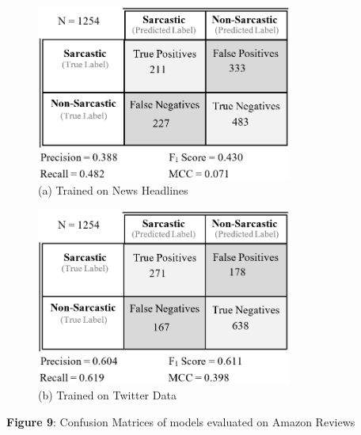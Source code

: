 \documentclass[12pt,a4paper]{article}
\begin{document}
\begin{minipage}{0.4\textwidth}
	\vspace{-5pt}\begin{figure}[H]
		\begin{center}
			\includegraphics[width=0.75\textwidth]{Images/cm2.png}\\
			(a) Trained on News Headlines\\
		\end{center}
	\end{figure}
\end{minipage}
\begin{minipage}{0.4\textwidth}
	\vspace{-5pt}\begin{figure}[H]
		\begin{center}
			\includegraphics[width=0.75\textwidth]{Images/cm1.png}\\
			(b) Trained on Twitter Data\\
		\end{center}
	\end{figure}
\end{minipage}\vspace{-17pt}

\begin{center}
	\textbf{Figure 9}: Confusion Matrices of models evaluated on Amazon Reviews\vspace{-8pt}
\end{center}
\end{document}
